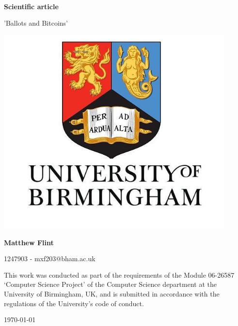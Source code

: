\documentclass{article}
\begin{document}
    \begin{center}
        \LARGE
        \textbf{Scientific article}
        
        \vspace{0.2cm}
        \large
        'Ballots and Bitcoins'
        
        \vspace{1cm}
        \includegraphics[width=0.9\textwidth]{university}

        \vfill
        
        \large
        \textbf{Matthew Flint}
        
        \vspace{0.3cm}
        \normalsize
        1247903 - mxf203@bham.ac.uk
        
        \vspace{0.5cm}
		This work was conducted as part of the requirements of the Module 06-26587 `Computer Science Project' of the Computer Science department at the University of Birmingham, UK, and is submitted in accordance with the regulations of the University's code of conduct.
		
		\vspace{0.2cm}
		\today
		
    \end{center}
    \newpage
\end{document}
